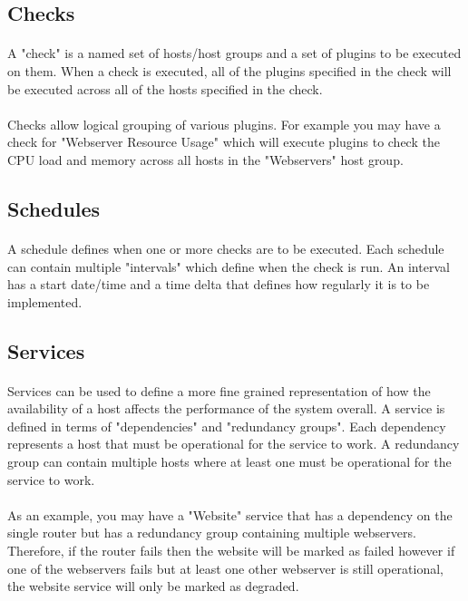 \documentclass[bsc,logo,twoside]{infthesis}
\begin{document}
\subsection{Checks}
\paragraph*{}
	A "check" is a named set of hosts/host groups and a set of plugins to be
	executed on them.  When a check is executed, all of the plugins specified in
	the check will be executed across all of the hosts specified in the check.
	
\paragraph*{}
	Checks allow logical grouping of various plugins.  For example you may have a
	check for "Webserver Resource Usage" which will execute plugins to check the
	CPU load and memory across all hosts in the "Webservers" host group.

\subsection{Schedules}
\paragraph*{}
	A schedule defines when one or more checks are to be executed.  Each schedule
	can contain multiple "intervals" which define when the check is run.  An
	interval has a start date/time and a time delta that defines how regularly
	it is to be implemented.

\subsection{Services}
\paragraph*{}
	Services can be used to define a more fine grained representation of how the
	availability of a host affects the performance of the system overall.  A
	service is defined in terms of "dependencies" and "redundancy groups". Each
	dependency represents a host that must be operational for the service to
	work. A redundancy group can contain multiple hosts where at least one must
	be operational for the service to work.
	
\paragraph*{}
	As an example, you may have a "Website" service that has a dependency on
	the single router but has a redundancy group containing multiple webservers.
	Therefore, if the router fails then the website will be marked as failed
	however if one of the webservers fails but at least one other webserver is
	still operational, the website service will only be marked as degraded.
\end{document}
